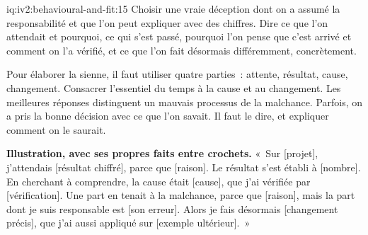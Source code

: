 \begin{solution}{iq:iv2:behavioural-and-fit:15}
Choisir une vraie déception dont on a assumé la responsabilité et que l'on peut expliquer avec des chiffres. Dire ce que l'on attendait et pourquoi, ce qui s'est passé, pourquoi l'on pense que c'est arrivé et comment on l'a vérifié, et ce que l'on fait désormais différemment, concrètement.

Pour élaborer la sienne, il faut utiliser quatre parties~: attente, résultat, cause, changement. Consacrer l'essentiel du temps à la cause et au changement. Les meilleures réponses distinguent un mauvais processus de la malchance. Parfois, on a pris la bonne décision avec ce que l'on savait. Il faut le dire, et expliquer comment on le saurait.

\textbf{Illustration, avec ses propres faits entre crochets.} «~Sur [projet], j'attendais [résultat chiffré], parce que [raison]. Le résultat s'est établi à [nombre]. En cherchant à comprendre, la cause était [cause], que j'ai vérifiée par [vérification]. Une part en tenait à la malchance, parce que [raison], mais la part dont je suis responsable est [son erreur]. Alors je fais désormais [changement précis], que j'ai aussi appliqué sur [exemple ultérieur].~»

\end{solution}

